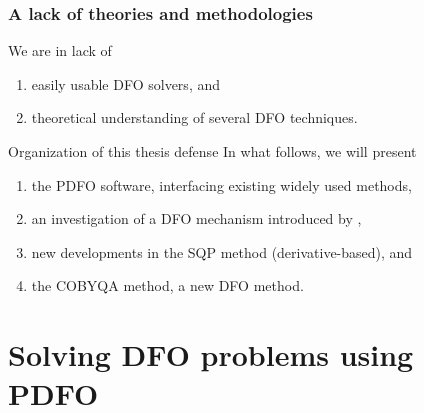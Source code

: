 \documentclass{polyu-presentation}
\begin{document}
\begin{frame}
    \frametitle{A lack of theories and methodologies}

    We are in lack of
    \begin{enumerate}
        \item easily usable DFO \alert{solvers}, and
        \item \alert{theoretical} understanding of several DFO techniques.
    \end{enumerate}

    \bigskip

    \begin{block}{Organization of this thesis defense}
        In what follows, we will present
        \begin{enumerate}
            \item the \alert{PDFO} software, interfacing existing widely used methods,
            \item an investigation of a \alert{DFO mechanism} introduced by \textcite{Powell_2006},
            \item new developments in the \alert{SQP method} (derivative-based), and
            \item the \alert{COBYQA} method, a new DFO method.
        \end{enumerate}
    \end{block}
\end{frame}

\section{Solving DFO problems using PDFO}
\end{document}
